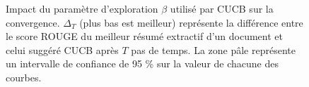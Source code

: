 \begin{figure}[ht!]
\begin{center}
    \end{center}
    \caption[Impact du paramètre d'exploration $\beta$ sur la convergence de CUCB avec intervalle de confiance de 95 \%]
    {Impact du paramètre d'exploration $\beta$ utilisé par CUCB sur la convergence.
    $\Delta_T$ (plus bas est meilleur) représente la différence entre le score ROUGE du meilleur résumé
    extractif d'un document et celui suggéré CUCB après $T$ pas de temps.
    La zone pâle représente un intervalle de confiance de 95 \% sur la valeur de chacune des courbes.}
\end{figure}

